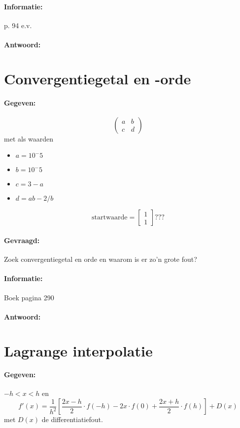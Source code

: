 \documentclass[12pt]{article}
\begin{document}
\paragraph{Informatie:} p. 94 e.v.
\paragraph{Antwoord:}

\newpage

\section{Convergentiegetal en -orde}
\paragraph{Gegeven:}
\[ \left( \begin{array}{ccc}
a & b  \\
c & d \end{array} \right)\]
met als waarden
\begin{itemize}
	\item $a = 10^-5$
	\item $b = 10^-5$
	\item $c = 3 - a$
	\item $d = ab - 2 / b$
\end{itemize}
\[ \text{startwaarde} = \begin{bmatrix} 1 \\
1\end{bmatrix} \text{???}\]

\paragraph{Gevraagd:} Zoek convergentiegetal en orde en waarom is er zo'n grote fout?
\paragraph{Informatie:} Boek pagina 290
\paragraph{Antwoord:}

\newpage

\section{Lagrange interpolatie}
\paragraph{Gegeven:} $-h < x < h$ en
\[
f'(x)= \frac{1}{h^2}[\frac{2x-h}{2} \cdot f(-h) - 2x \cdot f(0) + \frac{2x+h}{2} \cdot f(h)] + D(x)
\]
met $D(x)$ de differentiatiefout.
\end{document}
